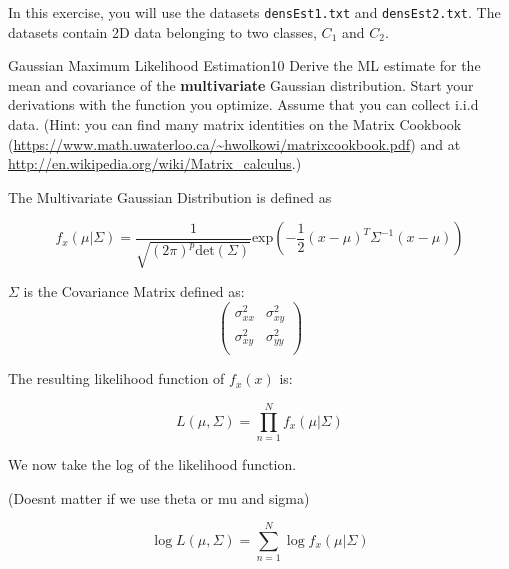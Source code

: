 \newif\ifvimbug
\vimbugfalse

\ifvimbug

\fi

In this exercise, you will use the datasets \texttt{densEst1.txt} 
and \texttt{densEst2.txt}. The datasets contain 2D data belonging
to two classes, $C_1$ and $C_2$.

\begin{questions}


\begin{question}{Gaussian Maximum Likelihood Estimation}{10}
Derive the ML estimate for the mean and covariance of the \textbf{multivariate} Gaussian distribution. Start your derivations with the function you optimize. Assume that you can collect i.i.d data. (Hint: you can find many matrix identities on the Matrix Cookbook (\url{https://www.math.uwaterloo.ca/~hwolkowi/matrixcookbook.pdf}) and at \url{http://en.wikipedia.org/wiki/Matrix_calculus}.)

\begin{answer}
The Multivariate Gaussian Distribution is defined as

\begin{equation}
	f_x(\mu|\Sigma) = \frac{1}{\sqrt{(2\pi)^p \text{det}(\Sigma)}} \text{exp} (-\frac{1}{2}(x-\mu)^T \Sigma^{-1} (x-\mu))
\end{equation}

$\Sigma$ is the Covariance Matrix defined as:
\begin{equation}
\begin{pmatrix}
	\sigma_{xx}^2 & \sigma_{xy}^2 \\
	\sigma_{xy}^2 & \sigma_{yy}^2 \\
\end{pmatrix}
\end{equation}

The resulting likelihood function of $f_x(x)$ is:

\begin{equation}
L(\mu, \Sigma) = \prod\limits_{n=1}^{N} f_x(\mu|\Sigma)
\end{equation}

We now take the log of the likelihood function. 

(Doesnt matter if we use theta or mu and sigma)

\begin{equation}
	\log L(\mu, \Sigma) = \sum_{n=1}^{N} \log f_x(\mu|\Sigma)
\end{equation}


\end{answer}
\end{question}
\end{questions}
